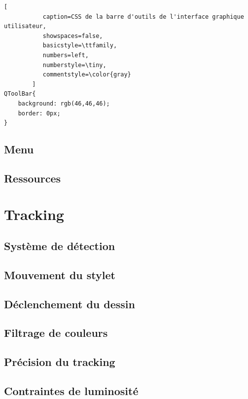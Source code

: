 \documentclass[11pt,a4paper,oldfontcommands]{memoir}
\begin{document}
\begin{lstlisting}[
           caption=CSS de la barre d'outils de l'interface graphique utilisateur,
           showspaces=false,
           basicstyle=\ttfamily,
           numbers=left,
           numberstyle=\tiny,
           commentstyle=\color{gray}
        ]
QToolBar{ 
    background: rgb(46,46,46); 
    border: 0px; 
}
\end{lstlisting}

\newpage

\subsection{Menu}

\subsection{Ressources}

\section{Tracking}

\subsection{Système de détection}

\subsection{Mouvement du stylet}

\subsection{Déclenchement du dessin}

\subsection{Filtrage de couleurs}

\subsection{Précision du tracking}

\subsection{Contraintes de luminosité}

\newpage
\end{document}
